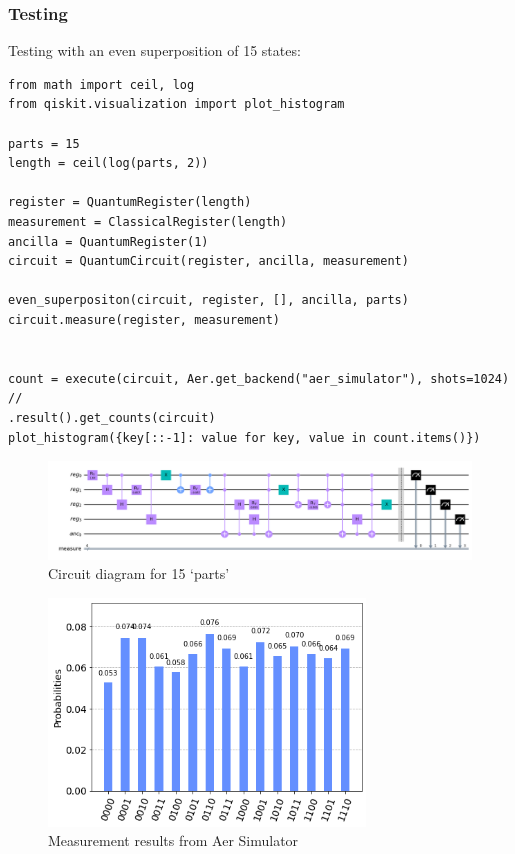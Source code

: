 \documentclass[12pt]{article}
\begin{document}
\subsubsection{Testing}
Testing with an even superposition of 15 states:

\begin{verbatim}
from math import ceil, log
from qiskit.visualization import plot_histogram

parts = 15
length = ceil(log(parts, 2))

register = QuantumRegister(length)
measurement = ClassicalRegister(length)
ancilla = QuantumRegister(1)
circuit = QuantumCircuit(register, ancilla, measurement)

even_superpositon(circuit, register, [], ancilla, parts)
circuit.measure(register, measurement)


count = execute(circuit, Aer.get_backend("aer_simulator"), shots=1024) //
.result().get_counts(circuit)
plot_histogram({key[::-1]: value for key, value in count.items()})
\end{verbatim}

\begin{figure}[h]
    \centering
    \includegraphics[width=\textwidth]{images/example_circuit.png}
    \caption{Circuit diagram for 15 `parts'}
    \label{fig:circ_diagram}
\end{figure}
\begin{figure}[h]
    \centering
    \includegraphics[width=0.75\textwidth]{images/example_measurement.png}
    \caption{Measurement results from Aer Simulator}
    \label{fig:measures}
\end{figure}
\end{document}
